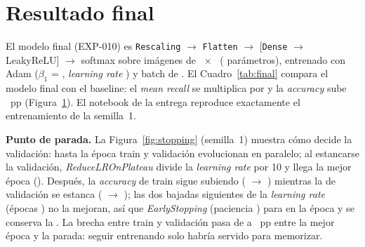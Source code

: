 \section{Resultado final}
\label{sec:final}
El modelo final (EXP-010) es \texttt{Rescaling} $\rightarrow$ \texttt{Flatten} $\rightarrow$ 
[\texttt{Dense} $\rightarrow$ LeakyReLU] $\rightarrow$ softmax sobre imágenes de
~$\times$~ ( parámetros), entrenado con Adam ($\beta_1$ =
, \emph{learning rate} ) y batch de . El Cuadro~\ref{tab:final}
compara el modelo final con el baseline: el \emph{mean recall} se multiplica por  y la
\emph{accuracy} sube ~pp (Figura~\ref{fig:progress}). El notebook de la entrega reproduce
exactamente el entrenamiento de la semilla~1.

\begin{table}[h]
  \centering\small
  \caption{Baseline frente al modelo final (validación; media $\pm$ desviación típica de  semillas).}
  \label{tab:final}
\end{table}

\begin{figure}[!htbp]
  \centering
  \caption{}
  \label{fig:progress}
\end{figure}

\textbf{Punto de parada.} La Figura~\ref{fig:stopping} (semilla~1) muestra cómo decide la validación: hasta la época
 train y validación evolucionan en paralelo; al estancarse la validación,
\emph{ReduceLROnPlateau} divide la \emph{learning rate} por 10 y llega la mejor época ().
Después, la \emph{accuracy} de train sigue subiendo ( $\rightarrow$ )
mientras la de validación se estanca ( $\rightarrow$ ); las dos
bajadas siguientes de la \emph{learning rate} (épocas ) no la mejoran, así que
\emph{EarlyStopping} (paciencia ) para en la época  y se conserva la
. La brecha entre train y validación pasa de  a ~pp entre la
mejor época y la parada: seguir entrenando solo habría servido para memorizar.

